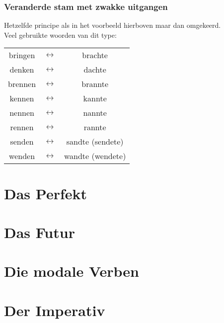 \documentclass[main.tex]{subfiles}
\begin{document}
\subsubsection{Veranderde stam met zwakke uitgangen}
Hetzelfde principe als in het voorbeeld hierboven maar dan omgekeerd.\\
Veel gebruikte woorden van dit type:\\
\begin{tabular}{c c c}

bringen & $\leftrightarrow$ & brachte \\ 

denken & $\leftrightarrow$ & dachte \\ 

brennen & $\leftrightarrow$ & brannte \\ 

kennen & $\leftrightarrow$ & kannte \\ 

nennen & $\leftrightarrow$ & nannte \\ 

rennen & $\leftrightarrow$ & rannte \\ 
 
senden & $\leftrightarrow$ & sandte (sendete) \\ 

wenden & $\leftrightarrow$ & wandte (wendete) \\ 
\end{tabular}
\section{Das Perfekt}

\section{Das Futur}

\section{Die modale Verben}

\section{Der Imperativ}
\end{document}

